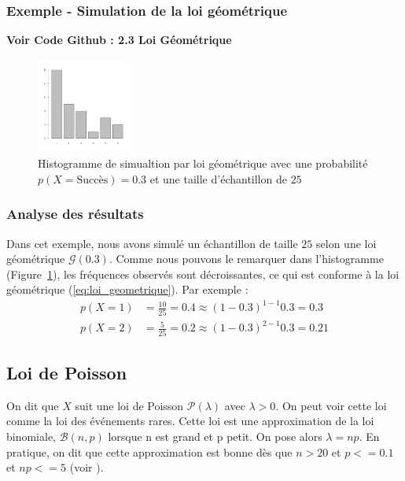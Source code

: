       \subsubsection{Exemple - Simulation de la loi géométrique}

      \textbf{Voir Code Github \cite{git} : 2.3 Loi Géométrique}

      \begin{figure}[H]
        \centering
        \includegraphics[width=0.28\textwidth]{4_attachments/figures/output4.png}
        \caption{Histogramme de simualtion par loi géométrique avec une probabilité $p(X= \text{Succès})=0.3$ et une taille d'échantillon de $25$}
        \label{fig:histogramme_ech}
      \end{figure}

    \subsubsection{Analyse des résultats}
    Dans cet exemple, nous avons simulé un échantillon de taille $25$ selon une loi géométrique $\mathcal G(0.3)$.
    Comme nous pouvons le remarquer dans l'histogramme (Figure~\ref{fig:histogramme_ech}), les fréquences observés sont décroissantes, ce qui est conforme à la loi géométrique (\ref{eq:loi_geometrique}). Par exemple :
    \[
      \begin{array}{ll}
        p(X=1) &= \frac{10}{25} = 0.4 \approx (1-0.3)^{1-1}0.3 = 0.3 \\ 
        p(X=2) &= \frac{5}{25} = 0.2 \approx (1-0.3)^{2-1}0.3 = 0.21
      \end{array}
    \]

    \subsection{Loi de Poisson}
      On dit que $X$ suit une loi de Poisson $\mathcal P(\lambda)$ avec $\lambda > 0$.
      On peut voir cette loi comme la loi des événements rares. 
      Cette loi est une approximation de la loi binomiale, $\mathcal B(n,p)$ lorsque n est grand et p petit. 
      On pose alors $\lambda=np$. En pratique, on dit que cette approximation est bonne dès que $n>20$ et $p<=0.1$ et $np<=5$ (voir \cite{poissonlaw}).

